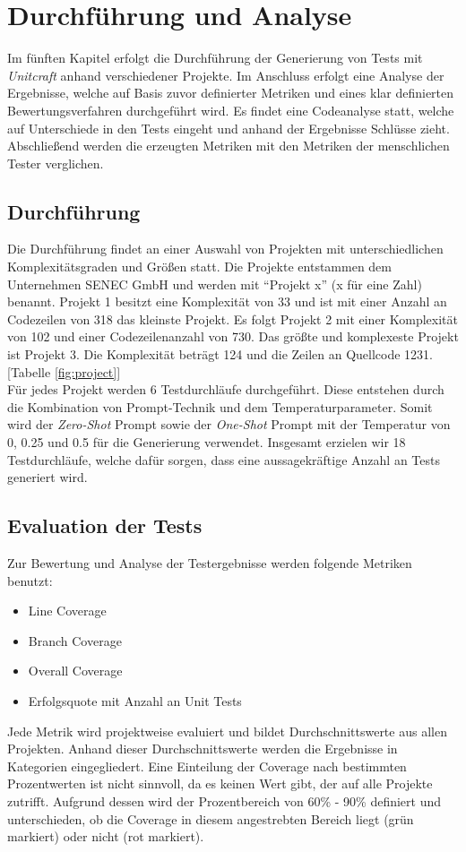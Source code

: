 \chapter{Durchführung und Analyse}
Im fünften Kapitel erfolgt die Durchführung der Generierung von Tests mit \textit{Unitcraft} anhand verschiedener Projekte. Im Anschluss erfolgt eine Analyse der Ergebnisse, welche auf Basis zuvor definierter Metriken und eines klar definierten Bewertungsverfahren durchgeführt wird. Es findet eine Codeanalyse statt, welche auf Unterschiede in den Tests eingeht und anhand der Ergebnisse Schlüsse zieht. Abschließend werden die erzeugten Metriken mit den Metriken der menschlichen Tester verglichen.

\section{Durchführung}
Die Durchführung findet an einer Auswahl von Projekten mit unterschiedlichen Komplexitätsgraden und Größen statt. Die Projekte entstammen dem Unternehmen SENEC GmbH und werden mit ``Projekt x'' (x für eine Zahl) benannt. Projekt 1 besitzt eine Komplexität von 33 und ist mit einer Anzahl an Codezeilen von 318 das kleinste Projekt. Es folgt Projekt 2 mit einer Komplexität von 102 und einer Codezeilenanzahl von 730. Das größte und komplexeste Projekt ist Projekt 3. Die Komplexität beträgt 124 und die Zeilen an Quellcode 1231. [Tabelle \ref{fig:project}]\\Für jedes Projekt werden 6 Testdurchläufe durchgeführt. Diese entstehen durch die Kombination von Prompt-Technik und dem Temperaturparameter. Somit wird der \textit{Zero-Shot} Prompt sowie der \textit{One-Shot} Prompt mit der Temperatur von 0, 0.25 und 0.5 für die Generierung verwendet. Insgesamt erzielen wir 18 Testdurchläufe, welche dafür sorgen, dass eine aussagekräftige Anzahl an Tests generiert wird.

\section{Evaluation der Tests}
Zur Bewertung und Analyse der Testergebnisse werden folgende Metriken benutzt: 
\begin{itemize}
    \setlength{\parskip}{1pt}
    \item Line Coverage
    \item Branch Coverage
    \item Overall Coverage
    \item Erfolgsquote mit Anzahl an Unit Tests
\end{itemize}
Jede Metrik wird projektweise evaluiert und bildet Durchschnittswerte aus allen Projekten. Anhand dieser Durchschnittswerte werden die Ergebnisse in Kategorien eingegliedert. Eine Einteilung der Coverage nach bestimmten Prozentwerten ist nicht sinnvoll, da es keinen Wert gibt, der auf alle Projekte zutrifft. Aufgrund dessen wird der Prozentbereich von 60\% - 90\% definiert und unterschieden, ob die Coverage in diesem angestrebten Bereich liegt (grün markiert) oder nicht (rot markiert). \cite{WhatReasonableCode}

